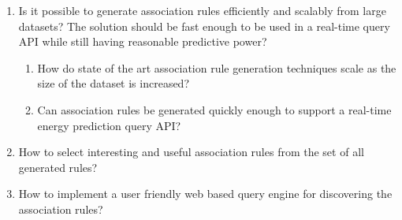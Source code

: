 \begin{enumerate}
	\item Is it possible to generate association rules efficiently and scalably from large datasets? The solution should be fast enough to be used in a real-time query API while still having reasonable predictive power?
	\begin{enumerate}
		\item How do state of the art association rule generation techniques scale as the size of the dataset is increased?
		
		\item Can association rules be generated quickly enough to support a real-time energy prediction query API?
	\end{enumerate}		
	
	\item How to select interesting and useful association rules from the set of all generated rules? 
	
	\item How to implement a user friendly web based query engine for discovering the association rules? 
\end{enumerate}  



